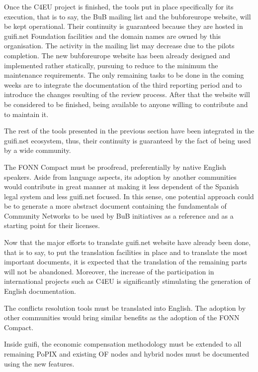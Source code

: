 Once the C4EU project is finished, the tools put in place specifically for its execution, that is to say, the BuB mailing list and the bubforeurope website, will be kept operational. Their continuity is guaranteed because they are hosted in guifi.net Foundation facilities and the domain names are owned by this organisation. The activity in the mailing list may decrease due to the pilots completion. The new bubforeurope website has been already designed and implemented rather statically, pursuing to reduce to the minimum the maintenance requirements. The only remaining tasks to be done in the coming weeks are to integrate the documentation of the third reporting period and to introduce the changes resulting of the review process. After that the website will be considered to be finished, being available to anyone willing to contribute and to maintain it.

The rest of the tools presented in the previous section have been integrated in the guifi.net ecosystem, thus, their continuity is guaranteed by the fact of being used by a wide community.

The FONN Compact must be proofread, preferentially by native English speakers. Aside from language aspects, its adoption by another communities  would contribute in great manner at making it less dependent of the Spanish legal system and less guifi.net focused. In this sense, one potential approach could be to generate a more abstract document containing the fundamentals of Community Networks to be used by BuB initiatives as a reference and as a starting point for their licenses.

Now that the major efforts to translate guifi.net website have already been done, that is to say, to put the translation facilities in place and to translate the most important documents, it is expected that the translation of the remaining parts will not be abandoned. Moreover, the increase of the participation in international projects such as C4EU is significantly stimulating the generation of English documentation.

The conflicts resolution tools must be translated into English. The adoption by other communities would bring similar benefits as the adoption of the FONN Compact.

Inside guifi, the economic compensation methodology must be extended to all remaining PoPIX and existing OF nodes and hybrid nodes must be documented using the new features.

